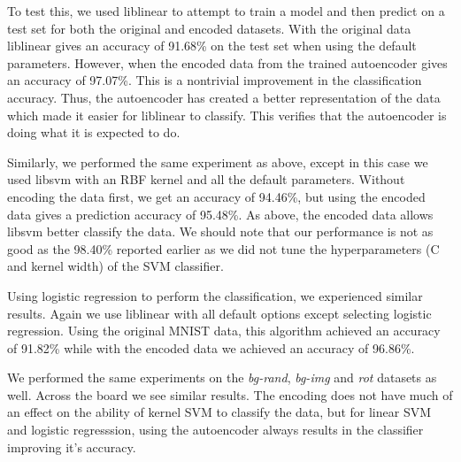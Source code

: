 To test this, we used liblinear \cite{fan2008liblinear} to attempt to train a model and then predict on
a test set for both the original and encoded datasets. With the original data
liblinear gives an accuracy of 91.68\% on the test set when using the default
parameters. However, when the encoded data from the trained autoencoder gives
an accuracy of 97.07\%. This is a nontrivial improvement in the classification
accuracy. Thus, the autoencoder has created a better representation of the data
which made it easier for liblinear to classify. This verifies that the
autoencoder is doing what it is expected to do.

Similarly, we performed the same experiment as above, except in this case we
used libsvm with an RBF kernel and all the default parameters.  Without
encoding the data first, we get an accuracy of 94.46\%, but using the encoded
data gives a prediction accuracy of 95.48\%. As above, the encoded data allows libsvm
better classify the data. We should note that our performance is not as good as the 98.40\% reported earlier as we did not tune the hyperparameters (C and kernel width) of the SVM classifier. 

Using logistic regression to perform the classification, we experienced similar results.
Again we use liblinear with all default options except selecting logistic regression. Using the
original MNIST data, this algorithm achieved an accuracy of 91.82\% while with the encoded data
we achieved an accuracy of 96.86\%.

We performed the same experiments on the \textit{bg-rand}, \textit{bg-img} and 
\textit{rot} datasets as well. Across the board we see similar results. The encoding does not have much of
an effect on the ability of kernel SVM to classify the data, but for linear SVM and logistic regresssion, 
using the autoencoder always results in the classifier improving it's accuracy. 


